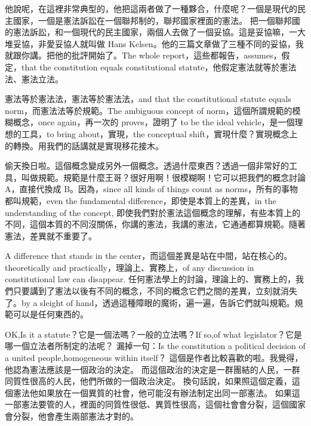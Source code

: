 \hypertarget{w05:cue:221}{}他說呢，在這裡非常典型的，他把這兩者做了一種夥合，什麼呢？一個是現代的民主國家，一個是憲法訴訟在一個聯邦制的，聯邦國家裡面的憲法。
\hypertarget{w05:cue:222}{}把一個聯邦國的憲法訴訟，和一個現代的民主國家，兩個人去做了一個妥協。這是妥協嘛，一大堆妥協，非愛妥協人就叫做 Hans Kelsen。他的三篇文章做了三種不同的妥協，我就跟你講。把他的批評開始了。The whole report，這些都報告，assumes，假定，that the constitution equals constitutional statute，他假定憲法就等於憲法法、憲法立法。

\hypertarget{w05:cue:223}{}憲法等於憲法法，憲法等於憲法法，and that the constitutional statute equals norm，而憲法法等於規範。The ambiguous concept of norm，這個所謂規範的模糊概念，once again，再一次的 proves，證明了 to be the ideal vehicle，是一個理想的工具，to bring about，實現，the conceptual shift，實現什麼？實現概念上的轉換。用我們的話講就是實現移花接木。

\hypertarget{w05:cue:224}{}偷天換日啦。這個概念變成另外一個概念。透過什麼東西？透過一個非常好的工具，叫做規範。規範是什麼王哥？很好用啊！很模糊啊！它可以把我們的概念討論 A，直接代換成 B。因為，since all kinds of things count as norms，所有的事物都叫規範，even the fundamental difference，即使是本質上的差異，in the understanding of the concept,
\hypertarget{w05:cue:225}{}即使我們對於憲法這個概念的理解，有些本質上的不同，這個本質的不同沒關係，你講的憲法，我講的憲法，它通通都算規範。隨著憲法，差異就不重要了。

\hypertarget{w05:cue:226}{}A difference that stands in the center，而這個差異是站在中間，站在核心的。theoretically and practically，理論上、實務上，of any discussion in constitutional law can disappear.
\hypertarget{w05:cue:227}{}任何憲法學上的討論，理論上的、實務上的，我們只要講到了憲法以後有不同的概念，不同的概念它們之間的差異，立刻就消失了。by a sleight of hand，透過這種障眼的魔術，遍一遍，告訴它們就叫規範。規範可以是任何東西的。

\hypertarget{w05:cue:228}{}OK,Is it a statute？它是一個法嗎？一般的立法嗎？If so,of what legislator？它是哪一個立法者所制定的法呢？
\hypertarget{w05:cue:229}{}漏掉一句：Is the constitution a political decision of a united people,homogeneous within itself？
\hypertarget{w05:cue:230}{}這個是作者比較喜歡的啦。我覺得，他認為憲法應該是一個政治的決定。
\hypertarget{w05:cue:231}{}而這個政治的決定是一群團結的人民，一群同質性很高的人民，他們所做的一個政治決定。
\hypertarget{w05:cue:232}{}換句話說，如果照這個定義，這個憲法他如果放在一個異質的社會，他可能沒有辦法制定出同一部憲法。
\hypertarget{w05:cue:233}{}如果這一部憲法要管的人，裡面的同質性很低、異質性很高，這個社會會分裂，這個國家會分裂，他會產生兩部憲法才對的。

